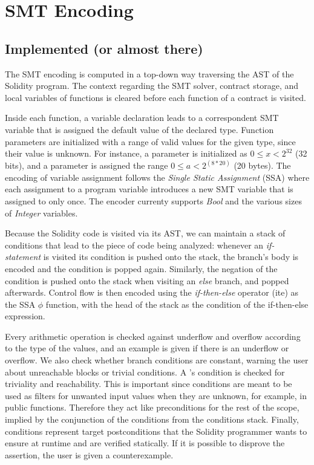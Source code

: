 \section{SMT Encoding}
\label{section:smt}

\subsection{Implemented (or almost there)}

The SMT encoding is computed in a top-down way traversing the AST of the
Solidity program.  The context regarding the SMT solver, contract storage, and
local variables of functions is cleared before each function of a contract is
visited.

Inside each function, a variable declaration leads to a correspondent SMT
variable that is assigned the default value of the declared type.
%
Function parameters are initialized with a range of valid values for the given
type, since their value is unknown.  For instance, a parameter 
is initialized as $0 \le x < 2^{32}$ (32 bits), and a parameter  is assigned the range $0 \le a < 2^{(8*20)}$ (20 bytes).
%
The encoding of variable assignment follows the \emph{Single Static Assignment}
(SSA) where each assignment to a program variable introduces a new SMT variable
that is assigned to only once.
%
The encoder currenty supports \emph{Bool} and the various sizes of
\emph{Integer} variables.

Because the Solidity code is visited via its AST, we can maintain a stack of
conditions that lead to the piece of code being analyzed: whenever an
\emph{if-statement} is visited its condition is pushed onto the stack, the
branch's body is encoded and the condition is popped again.
%
Similarly, the negation of the condition is pushed onto the stack when visiting
an \emph{else} branch, and popped afterwards.
%
Control flow is then encoded using the \emph{if-then-else} operator (ite) as
the SSA $\phi$ function, with the head of the stack as the condition of the
if-then-else expression.

Every arithmetic operation is checked against underflow and overflow according
to the type of the values, and an example is given if there is an underflow or
overflow.
%
We also check whether branch conditions are constant, warning the user about
unreachable blocks or trivial conditions.
%
A 's condition is checked for triviality and reachability.
%
This is important since  conditions are meant to be used as
filters for unwanted input values when they are unknown, for example, in public
functions.
%
Therefore they act like preconditions for the rest of the scope, implied by the
conjunction of the conditions from the conditions stack.
%
Finally,  conditions represent target postconditions that the
Solidity programmer wants to ensure at runtime and are verified statically.
%
If it is possible to disprove the assertion, the user is given a
counterexample.

